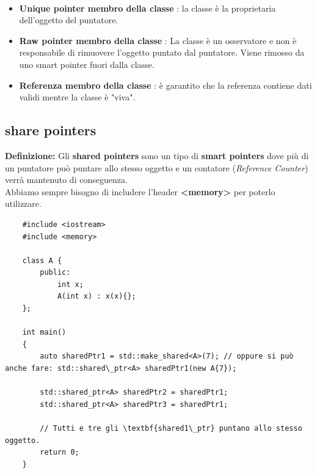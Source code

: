 \textsf{\small } \\

\begin{itemize}
	\item \textsf{\small \textbf{Unique pointer membro della classe} : la classe è la proprietaria dell'oggetto del puntatore.}
	\item \textsf{\small \textbf{Raw pointer membro della classe} : La classe è un osservatore e non è responsabile di rimuovere l'oggetto puntato dal puntatore. Viene rimosso da uno smart pointer fuori dalla classe.}
	\item \textsf{\small \textbf{Referenza membro della classe} : è garantito che la referenza contiene dati validi mentre la classe è "viva".}
\end{itemize}

\subsection{share pointers}

\textsf{\small \textbf{Definizione: } Gli \textbf{shared pointers} sono un tipo di \textbf{smart pointers} dove più di un puntatore può puntare allo stesso oggetto e un contatore (\emph{Reference Counter}) verrà mantenuto di conseguenza.} \\

\textsf{\small Abbiamo sempre bisogno di includere l'header \textbf{<memory>} per poterlo utilizzare.} \break

\begin{lstlisting}
	#include <iostream>
	#include <memory>
	
	class A {
		public:
			int x;
			A(int x) : x(x){};
	};

	int main()
	{
		auto sharedPtr1 = std::make_shared<A>(7); // oppure si può anche fare: std::shared\_ptr<A> sharedPtr1(new A{7});
		
		std::shared_ptr<A> sharedPtr2 = sharedPtr1;
		std::shared_ptr<A> sharedPtr3 = sharedPtr1;
		
		// Tutti e tre gli \textbf{shared1\_ptr} puntano allo stesso oggetto.
		return 0;
	}
\end{lstlisting}

\newpage %

